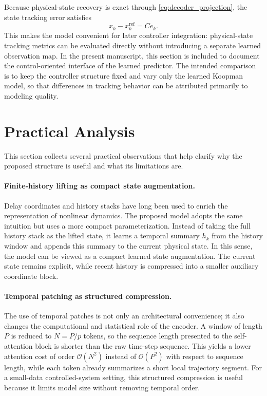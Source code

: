 \documentclass[journal]{IEEEtran}
\begin{document}
Because physical-state recovery is exact through \eqref{eq:decoder_projection}, the state tracking error satisfies
\begin{equation}
    x_k - x_k^{\mathrm{ref}} = C e_k.
\end{equation}
This makes the model convenient for later controller integration: physical-state tracking metrics can be evaluated directly without introducing a separate learned observation map. In the present manuscript, this section is included to document the control-oriented interface of the learned predictor. The intended comparison is to keep the controller structure fixed and vary only the learned Koopman model, so that differences in tracking behavior can be attributed primarily to modeling quality.

\section{Practical Analysis}
\label{sec:analysis}

This section collects several practical observations that help clarify why the proposed structure is useful and what its limitations are.

\paragraph{Finite-history lifting as compact state augmentation.}
Delay coordinates and history stacks have long been used to enrich the representation of nonlinear dynamics. The proposed model adopts the same intuition but uses a more compact parameterization. Instead of taking the full history stack as the lifted state, it learns a temporal summary $h_k$ from the history window and appends this summary to the current physical state. In this sense, the model can be viewed as a compact learned state augmentation. The current state remains explicit, while recent history is compressed into a smaller auxiliary coordinate block.

\paragraph{Temporal patching as structured compression.}
The use of temporal patches is not only an architectural convenience; it also changes the computational and statistical role of the encoder. A window of length $P$ is reduced to $N=P/p$ tokens, so the sequence length presented to the self-attention block is shorter than the raw time-step sequence. This yields a lower attention cost of order $\mathcal{O}(N^2)$ instead of $\mathcal{O}(P^2)$ with respect to sequence length, while each token already summarizes a short local trajectory segment. For a small-data controlled-system setting, this structured compression is useful because it limits model size without removing temporal order.
\end{document}
